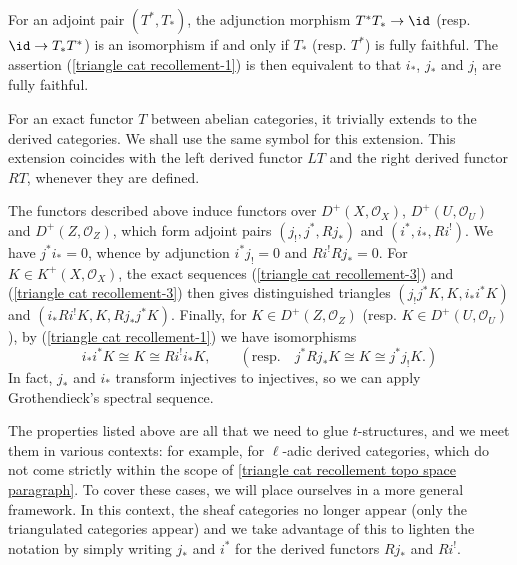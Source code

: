For an adjoint pair $(T^*,T_*)$, the adjunction morphism $T^*T_*\to\id$ (resp. $\id\to T_*T^*$) is an isomorphism if and only if $T_*$ (resp. $T^*$) is fully faithful. The assertion (\ref{triangle cat recollement-1}) is then equivalent to that $i_*$, $j_*$ and $j_!$ are fully faithful.\par

For an exact functor $T$ between abelian categories, it trivially extends to the derived categories. We shall use the same symbol for this extension. This extension coincides with the left derived functor $LT$ and the right derived functor $RT$, whenever they are defined.\par
The functors described above induce functors over $D^+(X,\mathscr{O}_X)$, $D^+(U,\mathscr{O}_U)$ and $D^+(Z,\mathscr{O}_Z)$, which form adjoint pairs $(j_!,j^*,Rj_*)$ and $(i^*,i_*,Ri^!)$. We have $j^*i_*=0$, whence by adjunction $i^*j_!=0$ and $Ri^!Rj_*=0$. For $K\in K^+(X,\mathscr{O}_X)$, the exact sequences (\ref{triangle cat recollement-3}) and (\ref{triangle cat recollement-3}) then gives distinguished triangles $(j_!j^*K,K,i_*i^*K)$ and $(i_*Ri^!K,K,Rj_*j^*K)$. Finally, for $K\in D^+(Z,\mathscr{O}_Z)$ (resp. $K\in D^+(U,\mathscr{O}_U)$), by (\ref{triangle cat recollement-1}) we have isomorphisms
\[i_*i^*K\cong K\cong Ri^!i_*K,\quad\quad(\text{resp.}\quad j^*Rj_*K\cong K\cong j^*j_!K.)\]
In fact, $j_*$ and $i_*$ transform injectives to injectives, so we can apply Grothendieck's spectral sequence.\par

The properties listed above are all that we need to glue $t$-structures, and we meet them in various contexts: for example, for $\ell$-adic derived categories, which do not come strictly within the scope of \ref{triangle cat recollement topo space paragraph}. To cover these cases, we will place ourselves in a more general framework. In this context, the sheaf categories no longer appear (only the triangulated categories appear) and we take advantage of this to lighten the notation by simply writing $j_*$ and $i^*$ for the derived functors $Rj_*$ and $Ri^!$.

